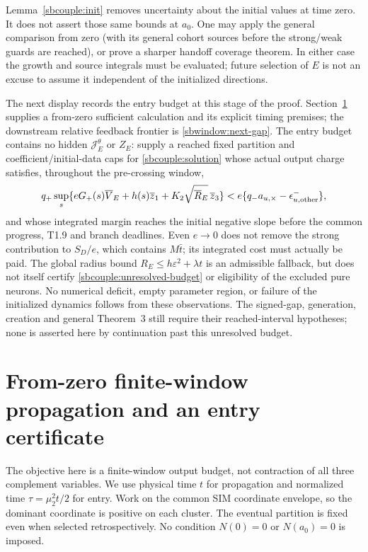 \documentclass{article} %
\theoremstyle{plain}
\theoremstyle{definition}
\theoremstyle{remark}
\begin{document}
Lemma~\ref{sbcouple:init} removes uncertainty about the initial values at
time zero. It does not assert those same bounds at $a_0$. One may apply
the general comparison from zero (with its general cohort sources before
the strong/weak guards are reached), or prove a sharper handoff coverage
theorem. In either case the growth and source integrals must be evaluated;
future selection of $E$ is not an excuse to assume it independent of
the initialized directions.

The next display records the entry budget at this stage of the proof.
Section~\ref{sbwindow:scope} supplies a from-zero sufficient calculation
and its explicit timing premises; the downstream relative feedback
frontier is \eqref{sbwindow:next-gap}. The entry budget
contains no hidden $\mathcal J_E^\theta$ or $Z_E$: supply a reached fixed
partition and coefficient/initial-data caps for \eqref{sbcouple:solution}
whose actual output charge satisfies, throughout the pre-crossing window,
\begin{equation}\label{sbcouple:unresolved-budget}
 q_+\sup_s\{eG_+(s)\overline V_E+h(s)\overline z_1
                  +K_2\sqrt{\overline R_E}\,\overline z_3\}
 <e\{q_-a_{u,\times}-\epsilon_{u,\rm other}^-\},
\end{equation}
and whose integrated margin reaches the initial negative slope before the
common progress, T1.9 and branch deadlines. Even $e\to0$ does not remove the
strong contribution to $S_D/e$, which contains $M\bar t$; its integrated
cost must actually be paid. The global radius bound
$R_E\le h\varepsilon^2+\lambda t$ is an admissible fallback, but does
not itself certify \eqref{sbcouple:unresolved-budget} or eligibility of
the excluded pure neurons. No numerical deficit, empty parameter region,
or failure of the initialized dynamics follows from these observations.
The signed-gap, generation, creation and general Theorem~3 still require
their reached-interval hypotheses; none is asserted here by continuation
past this unresolved budget.

\section{From-zero finite-window propagation and an entry certificate}
\label{sbwindow:scope}

The objective here is a finite-window output budget, not contraction of
all three complement variables. We use physical time $t$ for propagation
and normalized time $\tau=\mu_2^2t/2$ for entry. Work on the common SIM coordinate envelope, so the dominant coordinate
is positive on each cluster. The eventual partition is fixed even when
selected retrospectively. No condition $N(0)=0$ or
$N(a_0)=0$ is imposed.
\end{document}

